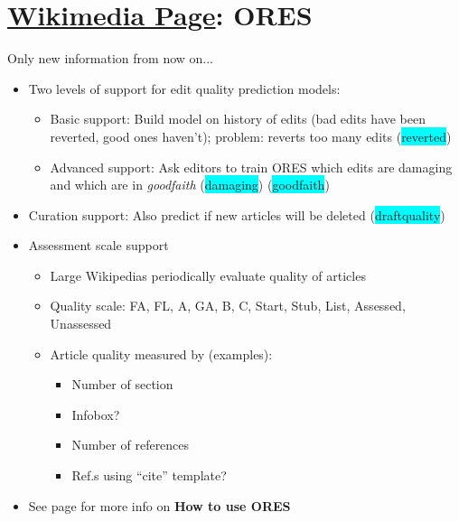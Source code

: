 \documentclass[12pt,a4paper]{article}
\begin{document}
\section{\href{https://www.mediawiki.org/wiki/ORES}{Wikimedia Page}: ORES}
\begin{description}
\item Only new information from now on...
\end{description}
\begin{itemize}
\item Two levels of support for edit quality prediction models:
\begin{itemize}
\item Basic support: Build model on history of edits (bad edits have been reverted, good ones haven't); problem: reverts too many edits (\colorbox{cyan}{reverted})
\item Advanced support: Ask editors to train ORES which edits are damaging and which are in \textit{goodfaith} (\colorbox{cyan}{damaging}) (\colorbox{cyan}{goodfaith})
\end{itemize}
\item Curation support: Also predict if new articles will be deleted (\colorbox{cyan}{draftquality})
\item Assessment scale support
\begin{itemize}
\item Large Wikipedias periodically evaluate quality of articles
\item Quality scale: FA, FL, A, GA, B, C, Start, Stub, List, Assessed, Unassessed
\item Article quality measured by (examples):
\begin{itemize}
\item Number of section
\item Infobox?
\item Number of references
\item Ref.s using ``cite'' template?
\end{itemize}
\end{itemize}
\item See page for more info on \textbf{How to use ORES}
\end{itemize}
\end{document}
